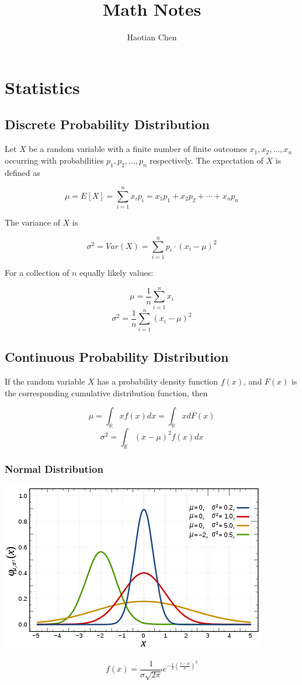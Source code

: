 \documentclass{article}
\title{Math Notes}
\author{Haotian Chen}
\date{}
\begin{document}
\maketitle

\clearpage

\tableofcontents{}

\clearpage

\section{Statistics}

\subsection{Discrete Probability Distribution}

\noindent Let \(X\) be a random variable with a finite number of finite outcomes \( x_{1},  x_{2}, \ldots, x_{n}\) occurring with probabilities \(p_{1}, p_{2}, \ldots, p_{n}\) respectively. The expectation of \(X\) is defined as

\[\mu = E[X] = \sum_{i=1}^{n}x_{i} p_{i} = x_{1} p_{1} + x_{2} p_{2} + \cdots  + x_{n} p_{n}\]

\noindent The variance of \(X\) is

\[\sigma^{2} = Var(X) = \sum_{i=1}^{n}p_{i} \cdot (x_{i} - \mu)^{2}\]

\noindent For a collection of \(n\) equally likely values:

\[\mu = \frac {1}{n} \sum_{i=1}^{n} x_{i}\]
\[\sigma^{2} = \frac {1}{n} \sum_{i=1}^{n} (x_{i} - \mu)^{2}\]

\subsection{Continuous Probability Distribution}

\noindent If the random variable \(X\) has a probability density function \(f(x)\), and \(F(x)\) is the corresponding cumulative distribution function, then

\[\mu =\int_{\mathbb{R}} x f(x) dx = \int_{\mathbb{R}} x dF(x)\]
\[\sigma^{2} = \int_{\mathbb{R}}(x - \mu)^{2} f(x) dx\]

\subsubsection{Normal Distribution}

\begin{center}
\includegraphics[scale=0.4]{./images/normal_distribution_pdf.png}
\end{center}

\[f(x) = \frac{1}{\sigma \sqrt{2\pi}} e^{-\frac{1}{2} (\frac{x - \mu}{\sigma })^{2}}\]

\printindex
\end{document}
